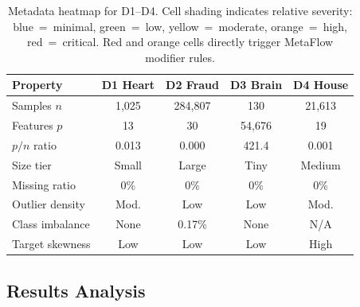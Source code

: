 \documentclass[conference]{IEEEtran}
\begin{document}
   \begin{table}[ht]
   \centering
   \caption{Metadata heatmap for D1--D4. Cell shading indicates relative severity: \colorbox{blue!20}{blue}~=~minimal, \colorbox{green!25}{green}~=~low, \colorbox{yellow!40}{yellow}~=~moderate, \colorbox{orange!30}{orange}~=~high, \colorbox{red!25}{red}~=~critical. Red and orange cells directly trigger MetaFlow modifier rules.}
   \label{tab:metadata_heatmap}
   \footnotesize
   \setlength{\tabcolsep}{3pt}
   \renewcommand{\arraystretch}{1.25}
   \begin{tabular}{@{}l|cccc@{}}
   \hline
   \textbf{Property} & \textbf{D1 Heart} & \textbf{D2 Fraud} & \textbf{D3 Brain} & \textbf{D4 House} \\
   \hline
   Samples $n$      & \cellcolor{yellow!40}1,025   & \cellcolor{red!25}284,807 & \cellcolor{blue!20}130    & \cellcolor{orange!30}21,613 \\
   Features $p$     & \cellcolor{green!25}13      & \cellcolor{green!25}30    & \cellcolor{red!25}54,676  & \cellcolor{green!25}19     \\
   $p/n$ ratio      & \cellcolor{green!25}0.013   & \cellcolor{green!25}0.000 & \cellcolor{red!25}421.4   & \cellcolor{green!25}0.001  \\
   Size tier        & \cellcolor{yellow!40}Small  & \cellcolor{red!25}Large   & \cellcolor{blue!20}Tiny   & \cellcolor{orange!30}Medium \\
   Missing ratio    & \cellcolor{green!25}0\%     & \cellcolor{green!25}0\%   & \cellcolor{green!25}0\%   & \cellcolor{green!25}0\%    \\
   Outlier density  & \cellcolor{yellow!40}Mod.   & \cellcolor{green!25}Low   & \cellcolor{green!25}Low   & \cellcolor{yellow!40}Mod.  \\
   Class imbalance  & \cellcolor{green!25}None    & \cellcolor{red!25}0.17\% & \cellcolor{green!25}None  & \cellcolor{gray!20}N/A     \\
   Target skewness  & \cellcolor{green!25}Low     & \cellcolor{green!25}Low   & \cellcolor{green!25}Low   & \cellcolor{orange!30}High  \\
   \hline
   \end{tabular}
   \end{table}

   \subsection{Results Analysis}
\end{document}
